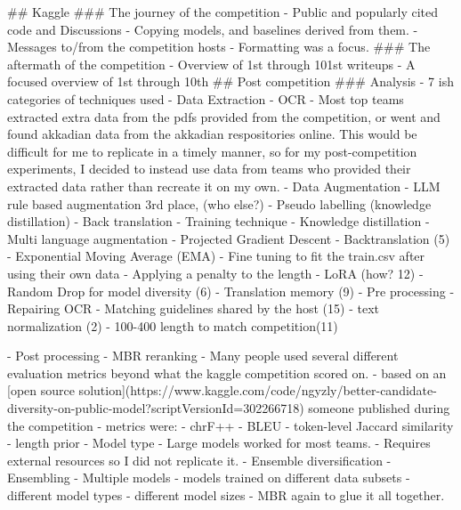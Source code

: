 ## Kaggle 
### The journey of the competition
- Public and popularly cited code and Discussions
- Copying models, and baselines derived from them.
- Messages to/from the competition hosts
    - Formatting was a focus.
### The aftermath of the competition
- Overview of 1st through 101st writeups
- A focused overview of 1st through 10th
## Post competition 
### Analysis
- 7 ish categories of techniques used
    - Data Extraction
        - OCR
            - Most top teams extracted extra data from the pdfs provided from the competition, or went and found akkadian data from the akkadian respositories online. This would be difficult for me to replicate in a timely manner, so for my post-competition experiments, I decided to instead use data from teams who provided their extracted data rather than recreate it on my own.
    - Data Augmentation
        -  LLM rule based augmentation
            3rd place, (who else?)
        - Pseudo labelling (knowledge distillation)
        - Back translation
    - Training technique
        - Knowledge distillation
        - Multi language augmentation
        - Projected Gradient Descent
        - Backtranslation (5)
        - Exponential Moving Average (EMA)
        - Fine tuning to fit the train.csv after using their own data
        - Applying a penalty to the length
        - LoRA (how? 12)
        - Random Drop for model diversity (6)
        - Translation memory (9)
    - Pre processing
        - Repairing OCR
        - Matching guidelines shared by the host (15)
            - text normalization (2)
        - 100-400 length to match competition(11)

    - Post processing
        - MBR reranking
            - Many people used several different evaluation metrics beyond what the kaggle competition scored on. 
                - based on an [open source solution](https://www.kaggle.com/code/ngyzly/better-candidate-diversity-on-public-model?scriptVersionId=302266718) someone published during the competition 
                - metrics were: 
                    - chrF++
                    - BLEU
                    - token-level Jaccard similarity
                    - length prior
    - Model type
        - Large models worked for most teams.
            - Requires external resources so I did not replicate it.
    - Ensemble diversification
        - Ensembling
        - Multiple models
            - models trained on different data subsets
            - different model types
            - different model sizes
        - MBR again to glue it all together.

